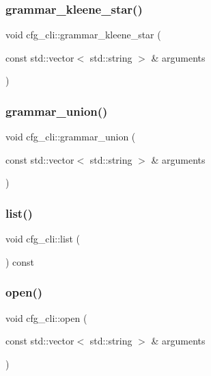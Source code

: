 \mbox{\label{classcfg__cli_ae1adc6d5a037500ed69d62e6834f60f9}} 
\subsubsection{\texorpdfstring{grammar\_kleene\_star()}{grammar\_kleene\_star()}}
{\footnotesize\ttfamily void cfg\+\_\+cli\+::grammar\+\_\+kleene\+\_\+star (\begin{DoxyParamCaption}\item[{const std\+::vector$<$ std\+::string $>$ \&}]{arguments }\end{DoxyParamCaption})}

\mbox{\label{classcfg__cli_ac6f35017786fa9f561e9278d3609e937}} 
\subsubsection{\texorpdfstring{grammar\_union()}{grammar\_union()}}
{\footnotesize\ttfamily void cfg\+\_\+cli\+::grammar\+\_\+union (\begin{DoxyParamCaption}\item[{const std\+::vector$<$ std\+::string $>$ \&}]{arguments }\end{DoxyParamCaption})}

\mbox{\label{classcfg__cli_afd8799d78f8f03d2ad6be723c8bcf2c5}} 
\subsubsection{\texorpdfstring{list()}{list()}}
{\footnotesize\ttfamily void cfg\+\_\+cli\+::list (\begin{DoxyParamCaption}{ }\end{DoxyParamCaption}) const}

\mbox{\label{classcfg__cli_a7cab592cbf2c62defe32013be876ae67}} 
\subsubsection{\texorpdfstring{open()}{open()}}
{\footnotesize\ttfamily void cfg\+\_\+cli\+::open (\begin{DoxyParamCaption}\item[{const std\+::vector$<$ std\+::string $>$ \&}]{arguments }\end{DoxyParamCaption})}

